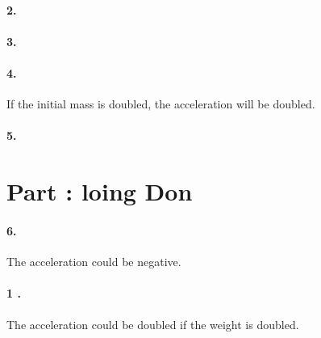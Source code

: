     \paragraph*{2.}

    \begin{mdframed}
        
    \end{mdframed}

    \paragraph*{3.}

    \begin{mdframed}
        
    \end{mdframed}

    \paragraph*{4.}

    \begin{mdframed}
        If the initial mass is doubled, the acceleration will be doubled.
    \end{mdframed}

    \paragraph*{5.}

    \begin{mdframed}
        
    \end{mdframed}

    \section*{Part : loing Don}

    \paragraph*{6.}

    \begin{mdframed}
        The acceleration could be negative.


    \end{mdframed}

    \paragraph*{1 .}

    \begin{mdframed}
        The acceleration could be doubled if the weight is doubled.
    \end{mdframed}

